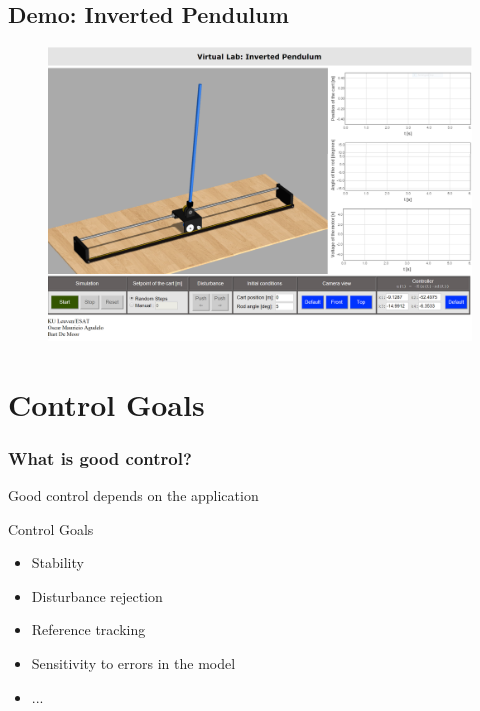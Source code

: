 \subsection[Demo: Inverted Pendulum]{Demo: Inverted Pendulum}
\begin{frame}
	\begin{figure}
\centering
\href{http://homes.esat.kuleuven.be/~magudelo/_html5/test11.html}{\includegraphics[width=1\linewidth]{"inverted-pendulum/full"}}
\label{fig:InvertedPendulum}
\end{figure}
\end{frame}

\section{Control Goals}
\begin{frame}
	\frametitle{What is good control?}
	\begin{block}{}
		Good control depends on the application
	\end{block}
	\begin{block}{Control Goals}
		\begin{itemize}
			\item Stability
			\item Disturbance rejection
			\item Reference tracking
			\item Sensitivity to errors in the model
			\item ...
		\end{itemize}
	\end{block}
\end{frame}

